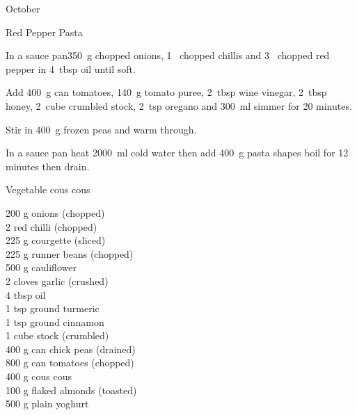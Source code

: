 \begin{menu}{October}
\begin{recipe}{2}{Red Pepper Pasta}
    \begin{instructions}
    \item 
        In a sauce pan350~g chopped onions,
        1~ chopped chillis
        and
        3~ chopped red pepper
        in
        4~tbsp  oil
        until soft.
      \item 
        Add
        400~g  can tomatoes,
        140~g  tomato puree,
        2~tbsp  wine vinegar,
        2~tbsp  honey,
        2~cube crumbled stock,
        2~tsp  oregano
        and
        300~ml  
        simmer for 20 minutes.
      \item 
        Stir in
        400~g  frozen peas
        and warm through.
      \item 
      In a sauce pan heat
      2000~ml  cold water then add
      400~g  pasta shapes
      boil for 12
      minutes then drain.
    
    \end{instructions}
    \end{recipe}%
  
    \begin{recipe}{2}{Vegetable cous cous}%
    
		\begin{ingredients}
		200 g onions (chopped) \\
	2  red chilli (chopped) \\
	225 g courgette (sliced) \\
	225 g runner beans (chopped) \\
	500 g cauliflower  \\
	2 cloves garlic (crushed) \\
	4 tbsp oil  \\
	1 tsp ground turmeric  \\
	1 tsp ground cinnamon  \\
	1 cube stock (crumbled) \\
	400 g can chick peas (drained) \\
	800 g can tomatoes (chopped) \\
	400 g cous cous  \\
	100 g flaked almonds (toasted) \\
	500 g plain yoghurt  \\
	
		\end{ingredients}
	

\end{recipe}
\end{menu}
